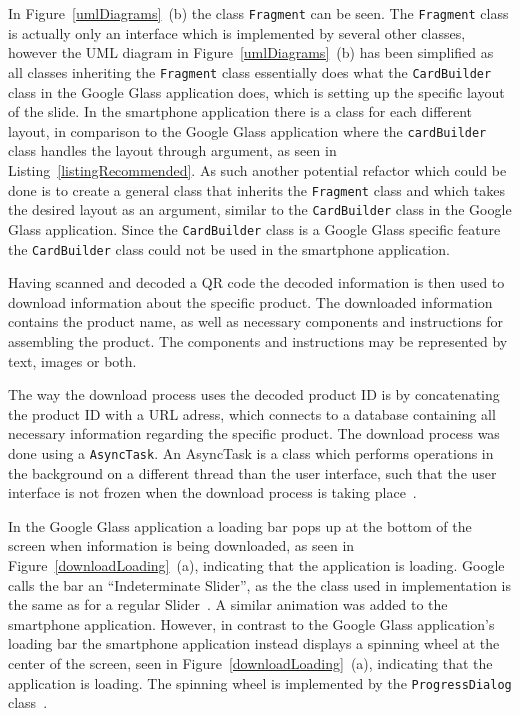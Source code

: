 In Figure~\ref{umlDiagrams}~(b) the class \texttt{Fragment} can be seen. The \texttt{Fragment} class is actually only an interface which is implemented by several other classes, however the UML diagram in Figure~\ref{umlDiagrams}~(b) has been simplified as all classes inheriting the \texttt{Fragment} class essentially does what the \texttt{CardBuilder} class in the Google Glass application does, which is setting up the specific layout of the slide. In the smartphone application there is a class for each different layout, in comparison to the Google Glass application where the \texttt{cardBuilder} class handles the layout through argument, as seen in Listing~\ref{listingRecommended}. As such another potential refactor which could be done is to create a general class that inherits the \texttt{Fragment} class and which takes the desired layout as an argument, similar to the \texttt{CardBuilder} class in the Google Glass application. Since the \texttt{CardBuilder} class is a Google Glass specific feature the \texttt{CardBuilder} class could not be used in the smartphone application.



Having scanned and decoded a QR code the decoded information is then used to download information about the specific product. The downloaded information contains the product name, as well as necessary components and instructions for assembling the product. The components and instructions may be represented by text, images or both. 

The way the download process uses the decoded product ID is by concatenating the product ID with a URL adress, which connects to a database containing all necessary information regarding the specific product. The download process was done using a \texttt{AsyncTask}. An AsyncTask is a class which performs operations in the background on a different thread than the user interface, such that the user interface is not frozen when the download process is taking place~\cite{asyncTask}.

In the Google Glass application a loading bar pops up at the bottom of the screen when information is being downloaded, as seen in Figure~\ref{downloadLoading}~(a), indicating that the application is loading. Google calls the bar an ``Indeterminate Slider'', as the the class used in implementation is the same as for a regular Slider~\cite{indeterminateSlide}. A similar animation was added to the smartphone application. However, in contrast to the Google Glass application's loading bar the smartphone application instead displays a spinning wheel at the center of the screen, seen in Figure~\ref{downloadLoading}~(a), indicating that the application is loading. The spinning wheel is implemented by the \texttt{ProgressDialog} class~\cite{loadingWheel}.

